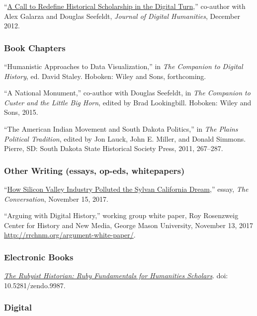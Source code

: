 ``\href{http://journalofdigitalhumanities.org/1-4/a-call-to-redefine-historical-scholarship-in-the-digital-turn/}{A
Call to Redefine Historical Scholarship in the Digital Turn},''
co-author with Alex Galarza and Douglas Seefeldt, \emph{Journal of
Digital Humanities}, December 2012.

\subsubsection{Book Chapters}\label{book-chapters}

``Humanistic Approaches to Data Visualization,'' in \emph{The Companion
to Digital History}, ed. David Staley. Hoboken: Wiley and Sons,
forthcoming.

``A National Monument,'' co-author with Douglas Seefeldt, in \emph{The
Companion to Custer and the Little Big Horn}, edited by Brad
Lookingbill. Hoboken: Wiley and Sons, 2015.

``The American Indian Movement and South Dakota Politics,'' in \emph{The
Plains Political Tradition}, edited by Jon Lauck, John E. Miller, and
Donald Simmons. Pierre, SD: South Dakota State Historical Society Press,
2011, 267--287.

\subsubsection{Other Writing (essays, op-eds,
whitepapers)}\label{other-writing-essays-op-eds-whitepapers}

``\href{https://theconversation.com/how-silicon-valley-industry-polluted-the-sylvan-california-dream-85810}{How
Silicon Valley Industry Polluted the Sylvan California Dream},'' essay,
\emph{The Conversation}, November 15, 2017.

``Arguing with Digital History,'' working group white paper, Roy
Rosenzweig Center for History and New Media, George Mason University,
November 13, 2017 \url{http://rrchnm.org/argument-white-paper/}.

\subsubsection{Electronic Books}\label{electronic-books}

\emph{\href{http://hepplerj.github.io/rubyist-historian/}{The Rubyist
Historian: Ruby Fundamentals for Humanities Scholars}}. doi:
10.5281/zendo.9987.

\subsubsection{Digital}\label{digital}

